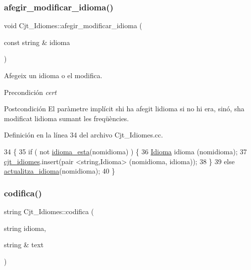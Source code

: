 \subsubsection{\texorpdfstring{afegir\+\_\+modificar\+\_\+idioma()}{afegir\_modificar\_idioma()}}
{\footnotesize\ttfamily void Cjt\+\_\+\+Idiomes\+::afegir\+\_\+modificar\+\_\+idioma (\begin{DoxyParamCaption}\item[{const string \&}]{idioma }\end{DoxyParamCaption})}



Afegeix un idioma o el modifica. 

\begin{DoxyPrecond}{Precondición}
{\itshape cert} 
\end{DoxyPrecond}
\begin{DoxyPostcond}{Postcondición}
El paràmetre implícit s\textquotesingle{}hi ha afegit l\textquotesingle{}idioma si no hi era, sinó, s\textquotesingle{}ha modificat l\textquotesingle{}idioma sumant les freqüències. 
\end{DoxyPostcond}


Definición en la línea 34 del archivo Cjt\+\_\+\+Idiomes.\+cc.


\begin{DoxyCode}
34                                                                   \{
35     \textcolor{keywordflow}{if} ( not \hyperlink{class_cjt___idiomes_a4c46be5ecf3b12b3f481ace7d487fdc3}{idioma\_esta}(nomidioma) ) \{
36         \hyperlink{class_idioma}{Idioma} idioma (nomidioma);
37         \hyperlink{class_cjt___idiomes_a1d294e628332477cbb3334cd8fb490a4}{cjt\_idiomes}.insert(pair <string,Idioma> (nomidioma, idioma));
38     \}
39     \textcolor{keywordflow}{else} \hyperlink{class_cjt___idiomes_a7aad6974355b73c50c2d5c1edc0a5c14}{actualitza\_idioma}(nomidioma);
40 \}
\end{DoxyCode}
\mbox{\label{class_cjt___idiomes_a745de8e5d29e235cb1e2142d8acaaad9}} 
\subsubsection{\texorpdfstring{codifica()}{codifica()}}
{\footnotesize\ttfamily string Cjt\+\_\+\+Idiomes\+::codifica (\begin{DoxyParamCaption}\item[{string}]{idioma,  }\item[{string \&}]{text }\end{DoxyParamCaption})}



